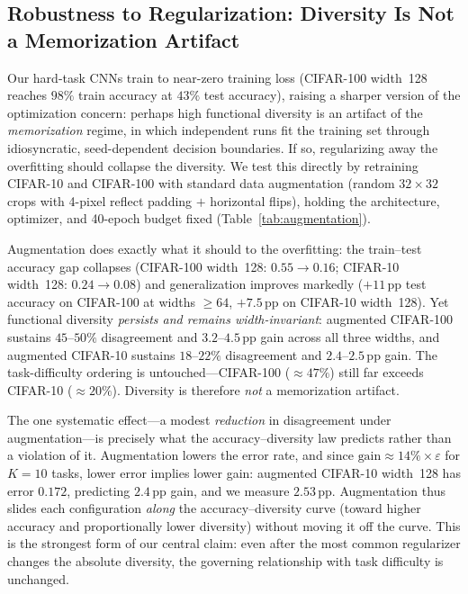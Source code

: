 \documentclass[11pt]{article}
\begin{document}
\subsection{Robustness to Regularization: Diversity Is Not a Memorization Artifact}
\label{sec:augmentation}

Our hard-task CNNs train to near-zero training loss (CIFAR-100 width~128
reaches $98\%$ train accuracy at $43\%$ test accuracy), raising a sharper
version of the optimization concern: perhaps high functional diversity is an
artifact of the \emph{memorization} regime, in which independent runs fit the
training set through idiosyncratic, seed-dependent decision boundaries.  If so,
regularizing away the overfitting should collapse the diversity.  We test this
directly by retraining CIFAR-10 and CIFAR-100 with standard data augmentation
(random $32\times32$ crops with 4-pixel reflect padding $+$ horizontal flips),
holding the architecture, optimizer, and 40-epoch budget fixed
(Table~\ref{tab:augmentation}).

Augmentation does exactly what it should to the overfitting: the train--test
accuracy gap collapses (CIFAR-100 width~128: $0.55\to0.16$; CIFAR-10
width~128: $0.24\to0.08$) and generalization improves markedly
($+11$\,pp test accuracy on CIFAR-100 at widths $\ge 64$, $+7.5$\,pp on
CIFAR-10 width~128).  Yet functional diversity \emph{persists and remains
width-invariant}: augmented CIFAR-100 sustains $45$--$50\%$ disagreement and
$3.2$--$4.5$\,pp gain across all three widths, and augmented CIFAR-10 sustains
$18$--$22\%$ disagreement and $2.4$--$2.5$\,pp gain.  The task-difficulty
ordering is untouched---CIFAR-100 ($\approx 47\%$) still far exceeds CIFAR-10
($\approx 20\%$).  Diversity is therefore \emph{not} a memorization artifact.

The one systematic effect---a modest \emph{reduction} in disagreement under
augmentation---is precisely what the accuracy--diversity law predicts rather
than a violation of it.  Augmentation lowers the error rate, and since
$\text{gain}\approx 14\%\times\varepsilon$ for $K=10$ tasks, lower error
implies lower gain: augmented CIFAR-10 width~128 has error $0.172$, predicting
$2.4$\,pp gain, and we measure $2.53$\,pp.  Augmentation thus slides each
configuration \emph{along} the accuracy--diversity curve (toward higher
accuracy and proportionally lower diversity) without moving it off the curve.
This is the strongest form of our central claim: even after the most common
regularizer changes the absolute diversity, the governing relationship with
task difficulty is unchanged.
\end{document}
